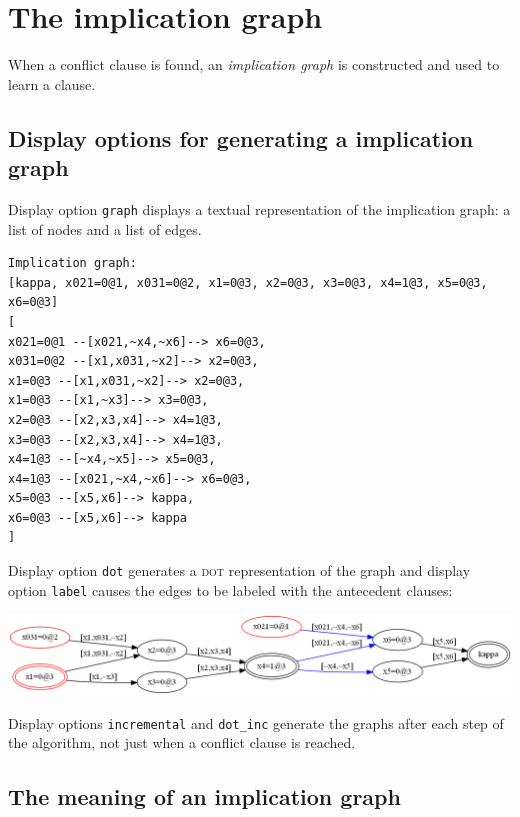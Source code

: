 \documentclass[11pt]{report}
\newcommand*{\p}[1]{\textup{\texttt{#1}}}
\begin{document}
\clearpage



\section{The implication graph}

When a conflict clause is found, an \emph{implication graph} is
constructed and used to learn a clause.

\subsection*{Display options for generating a implication graph}

Display option \p{graph} displays a textual representation of the implication graph: a list of nodes and a list of edges.

\begin{verbatim}
Implication graph:
[kappa, x021=0@1, x031=0@2, x1=0@3, x2=0@3, x3=0@3, x4=1@3, x5=0@3, x6=0@3]
[
x021=0@1 --[x021,~x4,~x6]--> x6=0@3,
x031=0@2 --[x1,x031,~x2]--> x2=0@3,
x1=0@3 --[x1,x031,~x2]--> x2=0@3,
x1=0@3 --[x1,~x3]--> x3=0@3,
x2=0@3 --[x2,x3,x4]--> x4=1@3,
x3=0@3 --[x2,x3,x4]--> x4=1@3,
x4=1@3 --[~x4,~x5]--> x5=0@3,
x4=1@3 --[x021,~x4,~x6]--> x6=0@3,
x5=0@3 --[x5,x6]--> kappa,
x6=0@3 --[x5,x6]--> kappa
]
\end{verbatim}

Display option \p{dot} generates a \textsc{dot} representation of the graph and display option \p{label} causes the edges to be labeled with the antecedent clauses:

\begin{center}
\includegraphics[keepaspectratio=true,width=\textwidth]{dom-color}
\end{center}

Display options \p{incremental} and \p{dot\_inc} generate the graphs after each step of the algorithm, not just when a conflict clause is reached.

\newpage

\subsection*{The meaning of an implication graph}
\end{document}
